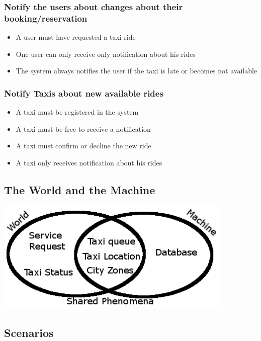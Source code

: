 		\subsubsection{Notify the users about changes about their booking/reservation}
		\begin{itemize}
			\item A user must have requested a taxi ride
			\item One user can only receive only notification about his rides
			\item The system always notifies the user if the taxi is late or becomes not available
		\end{itemize}
		\subsubsection{Notify Taxis about new available rides}
		\begin{itemize}
			\item A taxi must be registered in the system
			\item A taxi must be free to receive a notification
			\item A taxi must confirm or decline the new ride
			\item A taxi only receives notification about his rides
		\end{itemize}
	\subsection{The World and the Machine}
	\begin{center}
		\includegraphics[width=0.85\textwidth]{./images/ellissi}
	\end{center}
	\subsection{Scenarios}
